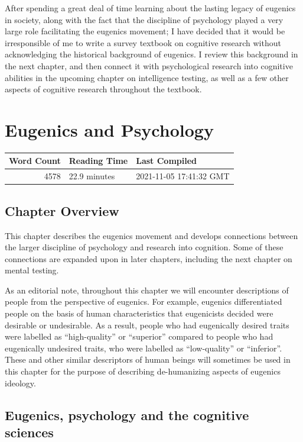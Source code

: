 \documentclass[
  oneside,
  12pt]{crumpbook}
\begin{document}
After spending a great deal of time learning about the lasting legacy of eugenics in society, along with the fact that the discipline of psychology played a very large role facilitating the eugenics movement; I have decided that it would be irresponsible of me to write a survey textbook on cognitive research without acknowledging the historical background of eugenics. I review this background in the next chapter, and then connect it with psychological research into cognitive abilities in the upcoming chapter on intelligence testing, as well as a few other aspects of cognitive research throughout the textbook.

\hypertarget{eugenics-and-psychology}{%
\chapter{Eugenics and Psychology}\label{eugenics-and-psychology}}

\begin{tabular}{r|l|l}
\hline
Word Count & Reading Time & Last Compiled\\
\hline
4578 & 22.9 minutes & 2021-11-05 17:41:32 GMT\\
\hline
\end{tabular}

\hypertarget{chapter-overview-2}{%
\section{Chapter Overview}\label{chapter-overview-2}}

This chapter describes the eugenics movement and develops connections between the larger discipline of psychology and research into cognition. Some of these connections are expanded upon in later chapters, including the next chapter on mental testing.

As an editorial note, throughout this chapter we will encounter descriptions of people from the perspective of eugenics. For example, eugenics differentiated people on the basis of human characteristics that eugenicists decided were desirable or undesirable. As a result, people who had eugenically desired traits were labelled as ``high-quality'' or ``superior'' compared to people who had eugenically undesired traits, who were labelled as ``low-quality'' or ``inferior''. These and other similar descriptors of human beings will sometimes be used in this chapter for the purpose of describing de-humanizing aspects of eugenics ideology.

\hypertarget{eugenics-psychology-and-the-cognitive-sciences}{%
\section{Eugenics, psychology and the cognitive sciences}\label{eugenics-psychology-and-the-cognitive-sciences}}
\end{document}
